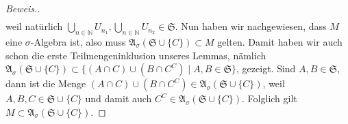 \begin{proof}[Beweis.]
\begin{align*}
    \end{align*}
    weil natürlich $\bigcup_{n\in\mathbb{N}}U_{n_1}, \bigcup_{n\in\mathbb{N}}U_{n_2}\in\mathfrak{S}$. Nun haben wir nachgewiesen, dass $M$ eine $\sigma$-Algebra ist, also muss $\mathfrak{A}_\sigma(\mathfrak{S}\cup\{C\})\subset M$ gelten. Damit haben wir auch schon die erste Teilmengeninklusion unseres Lemmas, nämlich $\mathfrak{A}_\sigma(\mathfrak{S}\cup\{C\})\subset\{(A\cap C)\cup(B \cap C^C)\mid A,B \in \mathfrak{S}\}$, gezeigt. \newline
    Sind $A,B\in\mathfrak{S}$, dann ist die Menge $(A\cap C)\cup(B \cap C^C)\in\mathfrak{A}_\sigma(\mathfrak{S}\cup\{C\})$, weil $A,B,C\in\mathfrak{S}\cup\{C\}$ und damit auch $C^C\in\mathfrak{A}_\sigma(\mathfrak{S}\cup\{C\})$. Folglich gilt $M\subset\mathfrak{A}_\sigma(\mathfrak{S}\cup\{C\})$.
\end{proof}